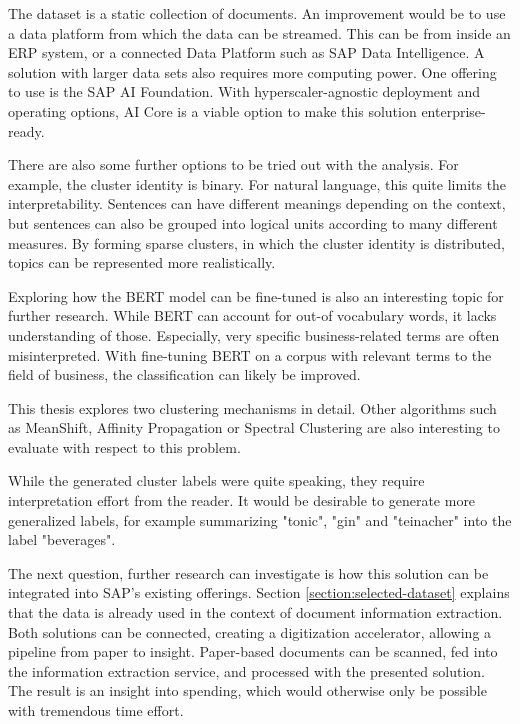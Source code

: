 The dataset is a static collection of documents. An improvement would be to use a data platform from which the data can be streamed. This can be from inside an \ac{ERP} system, or a connected Data Platform such as SAP Data Intelligence. A solution with larger data sets also requires more computing power. One offering to use is the SAP AI Foundation. With hyperscaler-agnostic deployment and operating options, AI Core is a viable option to make this solution enterprise-ready.

There are also some further options to be tried out with the analysis. For example, the cluster identity is binary. For natural language, this quite limits the interpretability. Sentences can have different meanings depending on the context, but sentences can also be grouped into logical units according to many different measures. By forming sparse clusters, in which the cluster identity is distributed, topics can be represented more realistically. 

Exploring how the \ac{BERT} model can be fine-tuned is also an interesting topic for further research. While \ac{BERT} can account for out-of vocabulary words, it lacks understanding of those. Especially, very specific business-related terms are often misinterpreted. With fine-tuning \ac{BERT} on a corpus with relevant terms to the field of business, the classification can likely be improved.

This thesis explores two clustering mechanisms in detail. Other algorithms such as MeanShift, Affinity Propagation or Spectral Clustering are also interesting to evaluate with respect to this problem.

While the generated cluster labels were quite speaking, they require interpretation effort from the reader. It would be desirable to generate more generalized labels, for example summarizing "tonic", "gin" and "teinacher" into the label "beverages".

The next question, further research can investigate is how this solution can be integrated into SAP's existing offerings. Section \ref{section:selected-dataset} explains that the data is already used in the context of document information extraction. Both solutions can be connected, creating a digitization accelerator, allowing a pipeline from paper to insight. Paper-based documents can be scanned, fed into the information extraction service, and processed with the presented solution. The result is an insight into spending, which would otherwise only be possible with tremendous time effort.



